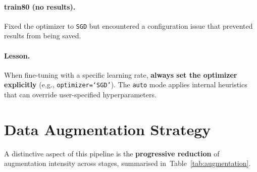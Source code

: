 \documentclass[12pt, titlepage]{article}
\begin{document}
\paragraph{train80 (no results).}  Fixed the optimizer to \texttt{SGD} but encountered a configuration issue that
prevented results from being saved.

\paragraph{Lesson.}  When fine-tuning with a specific learning rate, \textbf{always set the
  optimizer explicitly} (e.g., \texttt{optimizer=`SGD'}). The \texttt{auto} mode
applies internal heuristics that can override user-specified hyperparameters.

\section{Data Augmentation Strategy}
\label{sec:augmentation}

A distinctive aspect of this pipeline is the \textbf{progressive reduction} of
augmentation intensity across stages, summarised
in~Table~\ref{tab:augmentation}.
\end{document}
